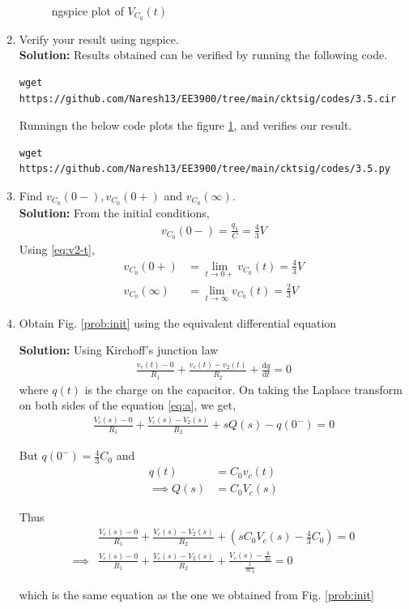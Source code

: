 \documentclass[journal,12pt,twocolumn]{IEEEtran}
\newcommand{\solution}{\noindent \textbf{Solution: }}
\providecommand{\brak}[1]{\ensuremath{\left(#1\right)}}
\providecommand{\der}[1]{\mathrm{d} #1}
\numberwithin{equation}{section}
\renewcommand\thesection{\arabic{section}}
\begin{document}
\begin{enumerate}[label=\arabic*.,ref=\thesection.\theenumi]
\begin{figure}[!ht]
	\caption{ngspice plot of $V_{C_0}(t)$} 
	\label{fig:ngspice2}
\end{figure}
	\item Verify your result using ngspice.\\
	\solution Results obtained can be verified by running the following code.
	\begin{lstlisting}
wget https://github.com/Naresh13/EE3900/tree/main/cktsig/codes/3.5.cir
	\end{lstlisting}
Runningn the below code plots the figure \ref{fig:ngspice2}, and verifies our result.
	\begin{lstlisting}
wget https://github.com/Naresh13/EE3900/tree/main/cktsig/codes/3.5.py
	\end{lstlisting}



	\item Find $v_{C_0}(0-), v_{C_0}(0+)$ and  $v_{C_0}(\infty) $.\\
\solution From the initial conditions,
\begin{align}
    v_{C_0}(0-) = \frac{q_1}{C} = {\frac{4}{3}}{V}
\end{align}
Using \eqref{eq:v2-t},
\begin{align}
    v_{C_0}(0+) &= \lim_{t \to 0+}v_{C_0}(t) = {\frac{4}{3}}{V} \\
    v_{C_0}(\infty) &= \lim_{t \to \infty}v_{C_0}(t) = {\frac{2}{3}}{V}
\end{align}

\item Obtain Fig. \ref{prob:init} using the equivalent differential equation

\solution Using Kirchoff's junction law
\begin{align}
	\label{eq:a}
	\frac{v_c(t) - 0}{R_1} + \frac{v_c(t) - v_2(t)}{R_2} + \frac{\der{q}}{\der{t}} = 0
\end{align}
where $q(t)$ is the charge on the capacitor.
On taking the Laplace transform on both sides of the equation \eqref{eq:a}, we get,
\begin{align}
	\frac{V_c(s) - 0}{R_1} + \frac{V_c(s) - V_2(s)}{R_2} +sQ(s) - q(0^-) = 0
\end{align}

But $q(0^-) = \frac43 C_0$ and 
\begin{align}
	q(t) &= C_0v_c(t) \\
	\implies Q(s) &= C_0V_c(s)
\end{align}

Thus
\begin{align}
	&\frac{V_c(s) - 0}{R_1} + \frac{V_c(s) - V_2(s)}{R_2} + \brak{sC_0V_c(s) - \frac43 C_0} = 0 \\
	\implies &\frac{V_c(s) - 0}{R_1} + 	\frac{V_c(s) - V_2(s)}{R_2} + \frac{V_c(s) - \frac{4}{3s}}{\frac{1}{sC_0}} = 0 
\end{align}

which is the same equation as the one we obtained from Fig. \ref{prob:init}
\end{enumerate}
	
\end{document}
